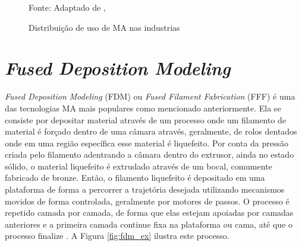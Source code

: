 \begin{figure}[H]
    \begin{center}
    \caption{Distribuição de uso de MA nas industrias}
    

    {\footnotesize Fonte: Adaptado de \citeauthor{bikas16}, \citeyear{bikas16}}
    \label{fig:MA_industrias}
    \end{center}
\end{figure}

\section{\textit{Fused Deposition Modeling}}
\textit{Fused Deposition Modeling} (FDM) ou \textit{Fused Filament Fabrication} (FFF) é uma das tecnologias MA mais populares como mencionado anteriormente. Ela se consiste por depositar material através de um processo onde um filamento de material é forçado dentro de uma câmara através, geralmente, de rolos dentados onde em uma região específica esse material é liquefeito. Por conta da pressão criada pelo filamento adentrando a câmara dentro do extrusor, ainda no estado sólido, o material liquefeito é extrudado através de um bocal, comumente fabricado de bronze. Então, o filamento liquefeito é depositado em uma plataforma de forma a percorrer a trajetória desejada utilizando mecanismos movidos de forma controlada, geralmente por motores de passos. O processo é repetido camada por camada, de forma que elas estejam apoiadas por camadas anteriores e a primeira camada continue fixa na plataforma ou cama, até que o processo finalize \cite{turner14}. A Figura \ref{fig:fdm_ex} ilustra este processo.

